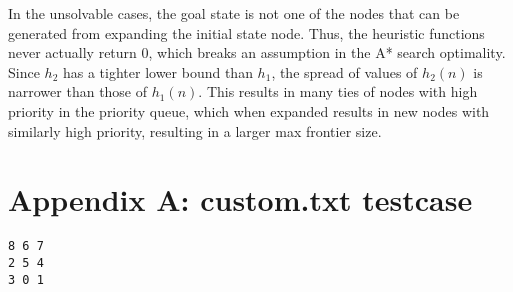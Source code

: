 \documentclass[10pt, a4paper]{article}
\theoremstyle{definition}
\begin{document}
In the unsolvable cases, the goal state is not one of the nodes that can be generated from expanding the initial state node.
Thus, the heuristic functions never actually return $0$, which breaks an assumption in the A* search optimality.
Since $h_2$ has a tighter lower bound than $h_1$, the spread of values of $h_2(n)$ is narrower than those of $h_1(n)$.
This results in many ties of nodes with high priority in the priority queue, which when expanded results in new nodes with similarly high priority, resulting in a larger max frontier size.




\section*{Appendix A: custom.txt testcase}
\begin{verbatim}
8 6 7
2 5 4
3 0 1
\end{verbatim}
\end{document}
